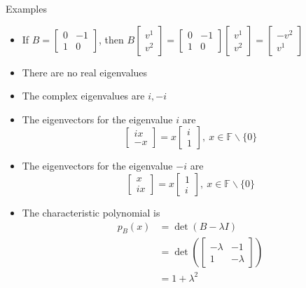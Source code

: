 \documentclass[usenames,dvipsnames,10pt]{beamer}
\newcommand\F{\mathbb{F}}
\begin{document}
\begin{frame}{Examples}

  \begin{itemize}
  \item If $B = \begin{bmatrix} 0 & -1 \\ 1 & 0\end{bmatrix}$, then
    $B\begin{bmatrix} v^1\\v^2\end{bmatrix} =\begin{bmatrix} 0 & -1 \\ 1 & 0\end{bmatrix}\begin{bmatrix} v^1\\v^2\end{bmatrix} =\begin{bmatrix} -v^2 \\ v^1 \end{bmatrix}$
  \item There are no real eigenvalues
  \item The complex eigenvalues are $i, -i$
  \item The eigenvectors for the eigenvalue $i$ are
    \[ \begin{bmatrix} ix \\ -x \end{bmatrix} = x\begin{bmatrix} i \\ 1 \end{bmatrix},\ x \in \F\backslash\{0\} \]
  \item The eigenvectors for the eigenvalue $-i$ are
    \[ \begin{bmatrix} x \\ ix \end{bmatrix} = x\begin{bmatrix} 1 \\ i \end{bmatrix},\ x \in \F\backslash\{0\} \]
  \item The characteristic polynomial is
    \begin{align*}
      p_B(x) &= \det(B-\lambda I)\\
             &= \det\left(\begin{bmatrix} -\lambda & -1 \\ 1 & -\lambda \end{bmatrix}\right)\\
             &= 1 + \lambda^2
    \end{align*}
  \end{itemize}
\end{frame}
\end{document}
